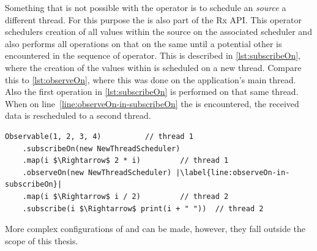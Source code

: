 Something that is not possible with the  operator is to schedule an \obs \textit{source} a different thread. For this purpose the  is also part of the Rx API. This operator schedulers creation of all values within the source on the associated scheduler and also performs all operations on that \obs on the same \sch until a potential other \sch is encountered in the sequence of operator. This is described in \autoref{lst:subscribeOn}, where the creation of the values within  is scheduled on a new thread. Compare this to \autoref{lst:observeOn}, where this was done on the application's main thread. Also the first  operation in \autoref{lst:subscribeOn} is performed on that same thread. When on line~\ref{line:observeOn-in-subscribeOn} the  is encountered, the received data is rescheduled to a second thread.

\begin{minipage}{\linewidth}
\begin{lstlisting}[style=ScalaStyle, caption={\code{subscribeOn} in a Rx sequence}, label={lst:subscribeOn}]
Observable(1, 2, 3, 4)			// thread 1
    .subscribeOn(new NewThreadScheduler)
    .map(i $\Rightarrow$ 2 * i)			// thread 1
    .observeOn(new NewThreadScheduler) |\label{line:observeOn-in-subscribeOn}|
    .map(i $\Rightarrow$ i / 2)			// thread 2
    .subscribe(i $\Rightarrow$ print(i + " "))	// thread 2
\end{lstlisting}
\end{minipage}

More complex configurations of  and  can be made, however, they fall outside the scope of this thesis.